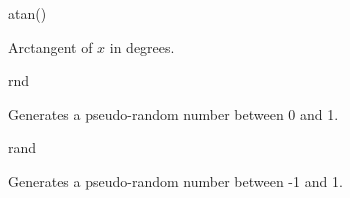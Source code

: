 \begin{math-function}{atan()}

	Arctangent of $x$ in degrees. 

\begin{codeexample}[post=\tt\footnotesize\pgfmathresult]
\end{codeexample}

\end{math-function}

\begin{math-function}{rnd}

	Generates a pseudo-random number between 0 and 1.

\begin{codeexample}[post=\tt\footnotesize\pgfmathresult]
\end{codeexample}

\begin{codeexample}[post=\tt\footnotesize\pgfmathresult]
\end{codeexample}

\begin{codeexample}[post=\tt\footnotesize\pgfmathresult]
\end{codeexample}

\end{math-function}

\begin{math-function}{rand}

	Generates a pseudo-random number between -1 and 1.

\begin{codeexample}[post=\tt\footnotesize\pgfmathresult]
\end{codeexample}

\begin{codeexample}[post=\tt\footnotesize\pgfmathresult]
\end{codeexample}

\end{math-function}

\endgroup